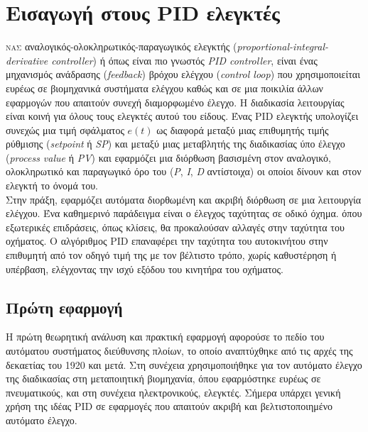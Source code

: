 


\section{Εισαγωγή στους PID ελεγκτές}

\lettrine[findent=2pt]{}{νας} αναλογικός-ολοκληρωτικός-παραγωγικός ελεγκτής (\emph{proportional-integral-derivative controller}) ή όπως είναι πιο γνωστός \emph{PID controller}, είναι ένας μηχανισμός ανάδρασης (\emph{feedback}) βρόχου ελέγχου (\emph{control loop}) που χρησιμοποιείται ευρέως σε βιομηχανικά συστήματα ελέγχου καθώς και σε μια ποικιλία άλλων εφαρμογών που απαιτούν συνεχή διαμορφωμένο έλεγχο. Η διαδικασία λειτουργίας είναι κοινή για όλους τους ελεγκτές αυτού του είδους. Ένας PID ελεγκτής υπολογίζει συνεχώς μια τιμή σφάλματος $e(t)$ ως διαφορά μεταξύ μιας επιθυμητής τιμής ρύθμισης (\emph{setpoint} ή \emph{SP}) και μεταξύ μιας μεταβλητής της διαδικασίας ύπο έλεγχο (\emph{process value} ή \emph{PV}) και εφαρμόζει μια διόρθωση βασισμένη στον αναλογικό, ολοκληρωτικό και παραγωγικό όρο του (\emph{P}, \emph{I}, \emph{D} αντίστοιχα) οι οποίοι δίνουν και στον ελεγκτή το όνομά του.\\
\linebreak
Στην πράξη, εφαρμόζει αυτόματα διορθωμένη και ακριβή διόρθωση σε μια λειτουργία ελέγχου. Ένα καθημερινό παράδειγμα είναι ο έλεγχος ταχύτητας σε οδικό όχημα. όπου εξωτερικές επιδράσεις, όπως κλίσεις, θα προκαλούσαν αλλαγές στην ταχύτητα του οχήματος. Ο αλγόριθμος PID επαναφέρει την ταχύτητα του αυτοκινήτου στην επιθυμητή από τον οδηγό τιμή της με τον βέλτιστο τρόπο, χωρίς καθυστέρηση ή υπέρβαση, ελέγχοντας την ισχύ εξόδου του κινητήρα του οχήματος.

\subsection{Πρώτη εφαρμογή}

Η πρώτη θεωρητική ανάλυση και πρακτική εφαρμογή αφορούσε το πεδίο του αυτόματου συστήματος διεύθυνσης πλοίων, το οποίο αναπτύχθηκε από τις αρχές της δεκαετίας του 1920 και μετά. Στη συνέχεια χρησιμοποιήθηκε για τον αυτόματο έλεγχο της διαδικασίας στη μεταποιητική βιομηχανία, όπου εφαρμόστηκε ευρέως σε πνευματικούς, και στη συνέχεια ηλεκτρονικούς, ελεγκτές. Σήμερα υπάρχει γενική χρήση της ιδέας PID σε εφαρμογές που απαιτούν ακριβή και βελτιστοποιημένο αυτόματο έλεγχο.










